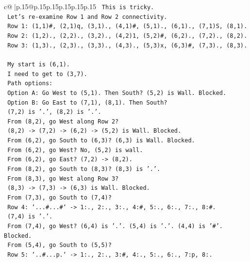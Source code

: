 \documentclass{article}
\begin{document}
{\begin{supertabular}{c@{$\;$}|p{.15\linewidth}@{}p{.15\linewidth}p{.15\linewidth}p{.15\linewidth}p{.15\linewidth}p{.15\linewidth}}
{{{\texttt{     This is tricky.} \\
\texttt{     Let's re{-}examine Row 1 and Row 2 connectivity.} \\
\texttt{     Row 1: (1,1)\#, (2,1)q, (3,1)., (4,1)\#, (5,1)., (6,1)., (7,1)S, (8,1).} \\
\texttt{     Row 2: (1,2)., (2,2)., (3,2)., (4,2)1, (5,2)\#, (6,2)., (7,2)., (8,2).} \\
\texttt{     Row 3: (1,3)., (2,3)., (3,3)., (4,3)., (5,3)x, (6,3)\#, (7,3)., (8,3).} \\
\\ 
\texttt{     My start is (6,1).} \\
\texttt{     I need to get to (3,7).} \\
\texttt{     Path options:} \\
\texttt{     Option A: Go West to (5,1). Then South? (5,2) is Wall. Blocked.} \\
\texttt{     Option B: Go East to (7,1), (8,1). Then South?} \\
\texttt{       (7,2) is '.', (8,2) is '.'.} \\
\texttt{       From (8,2), go West along Row 2?} \\
\texttt{       (8,2) {-}> (7,2) {-}> (6,2) {-}> (5,2) is Wall. Blocked.} \\
\texttt{       From (6,2), go South to (6,3)? (6,3) is Wall. Blocked.} \\
\texttt{       From (6,2), go West? No, (5,2) is wall.} \\
\texttt{       From (6,2), go East? (7,2) {-}> (8,2).} \\
\texttt{       From (8,2), go South to (8,3)? (8,3) is '.'.} \\
\texttt{       From (8,3), go West along Row 3?} \\
\texttt{       (8,3) {-}> (7,3) {-}> (6,3) is Wall. Blocked.} \\
\texttt{       From (7,3), go South to (7,4)?} \\
\texttt{       Row 4: `...\#...\#` {-}> 1:., 2:., 3:., 4:\#, 5:., 6:., 7:., 8:\#.} \\
\texttt{       (7,4) is '.'.} \\
\texttt{       From (7,4), go West? (6,4) is '.'. (5,4) is '.'. (4,4) is '\#'. Blocked.} \\
\texttt{       From (5,4), go South to (5,5)?} \\
\texttt{       Row 5: `..\#...p.` {-}> 1:., 2:., 3:\#, 4:., 5:., 6:., 7:p, 8:.} \\
}}}
\end{supertabular}}
\end{document}
